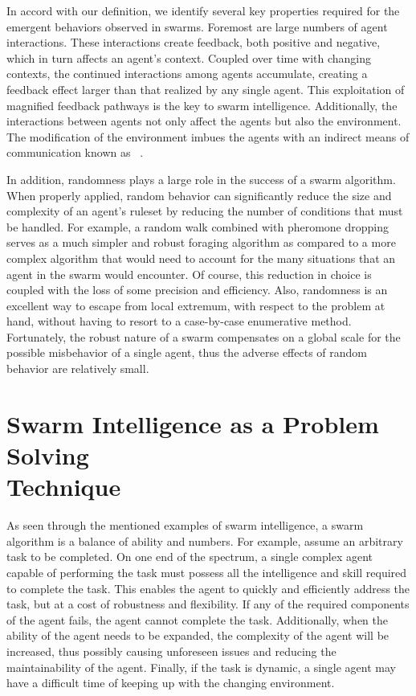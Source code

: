 In accord with our definition, we identify several key properties required for the emergent behaviors observed in swarms.  Foremost are large numbers of agent interactions.  These interactions create feedback, both positive and negative, which in turn affects an agent's context.  Coupled over time with changing contexts, the continued interactions among agents accumulate, creating a feedback effect larger than that realized by any single agent.  This exploitation of magnified feedback pathways is the key to swarm intelligence.  Additionally, the interactions between agents not only affect the agents but also the environment.  The modification of the environment imbues the agents with an indirect means of communication known as ~\cite{grasse:Stigmergy}.

In addition, randomness plays a large role in the success of a swarm algorithm.  When properly applied, random behavior can significantly reduce the size and complexity of an agent's ruleset by reducing the number of conditions that must be handled.  For example, a random walk combined with pheromone dropping serves as a much simpler and robust foraging algorithm as compared to a more complex algorithm that would need to account for the many situations that an agent in the swarm would encounter.  Of course, this reduction in choice is coupled with the loss of some precision and efficiency.  Also, randomness is an excellent way to escape from local extremum, with respect to the problem at hand, without having to resort to a case-by-case enumerative method.  Fortunately, the robust nature of a swarm compensates on a global scale for the possible misbehavior of a single agent, thus the adverse effects of random behavior are relatively small.  

\section[Swarm Intelligence as a Problem Solving Technique]{Swarm Intelligence as a Problem Solving \\ Technique}

As seen through the mentioned examples of swarm intelligence, a swarm algorithm is a balance of ability and numbers.  For example, assume an arbitrary task to be completed.  On one end of the spectrum, a single complex agent capable of performing the task must possess all the intelligence and skill required to complete the task.  This enables the agent to quickly and efficiently address the task, but at a cost of robustness and flexibility.  If any of the required components of the agent fails, the agent cannot complete the task.  Additionally, when the ability of the agent needs to be expanded, the complexity of the agent will be increased, thus possibly causing unforeseen issues and reducing the maintainability of the agent.  Finally, if the task is dynamic, a single agent may have a difficult time of keeping up with the changing environment.

